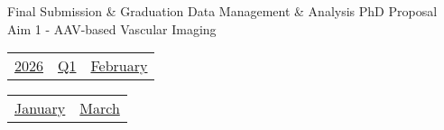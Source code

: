 \vfill{\centering{} \small{Final Submission \& Graduation}\hspace{1.5em} \small{Data Management \& Analysis}\hspace{1.5em} \small{PhD Proposal}\hspace{1.5em} \small{Aim 1 - AAV-based Vascular Imaging}\hspace{1.5em}\par}

\pagebreak
{\noindent\Large\renewcommand{\arraystretch}{\myNumArrayStretch}\begin{tabular}{|l|l|l}
\hyperlink{2026}{2026} & \hyperlink{Q1}{Q1} & \hyperlink{February}{February}
\end{tabular}\hfill%
\begin{tabular}{r|r@{}}
\hyperlink{month-2026-1}{January} & \hyperlink{month-2026-3}{March}
\end{tabular}}
\myLineThick
